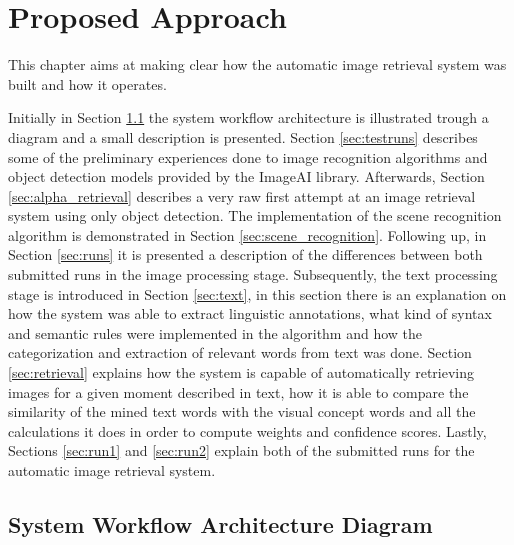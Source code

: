 \cleardoublepage

\chapter{Proposed Approach}
\label{ch:initial_work}

This chapter aims at making clear how the automatic image retrieval system was built and how it operates.



Initially in Section \ref{sec:diagram} the system workflow architecture is illustrated trough a diagram and a small description is presented. Section \ref{sec:testruns} describes some of the preliminary experiences done to image recognition algorithms and object detection models provided by the ImageAI library. Afterwards, Section \ref{sec:alpha_retrieval} describes a very raw first attempt at an image retrieval system using only object detection. The implementation of the scene recognition algorithm is demonstrated in Section \ref{sec:scene_recognition}. Following up, in Section \ref{sec:runs} it is presented a description of the differences between both submitted runs in the image processing stage. Subsequently, the text processing stage is introduced in Section \ref{sec:text}, in this section there is an explanation on how the system was able to extract linguistic annotations, what kind of syntax and semantic rules were implemented in the algorithm and how the categorization and extraction of relevant words from text was done. Section \ref{sec:retrieval} explains how the system is capable of automatically retrieving images for a given moment described in text, how it is able to compare the similarity of the mined text words with the visual concept words and all the calculations it does in order to compute weights and confidence scores. Lastly, Sections \ref{sec:run1} and \ref{sec:run2} explain both of the submitted runs for the automatic image retrieval system. 



\section{System Workflow Architecture Diagram}
\label{sec:diagram}
   
